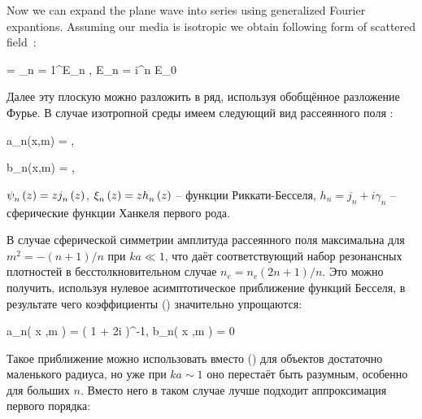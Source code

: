 Now we can expand the plane wave into series using generalized Fourier expantions. Assuming our media is isotropic we obtain following form of scattered field~\cite{boren_huffman}:

    \eq
		 = \sum_{n = 1}^{\infty}E_n , \qquad E_n = i^{n} E_0 
        \label{E_s_sph}
	\qe

    Далее эту плоскую можно разложить в ряд, используя обобщённое разложение Фурье. В случае изотропной среды имеем следующий вид рассеянного поля \cite{boren_huffman}:


    \eq
		a_n(x,\:m) = ,
		\label{an_bessel}
	\qe

    \eq
        b_n(x,\:m) = ,
        \label{bn_bessel}
    \qe
    \eqc %
    \cqe %

 ${\psi}_{n}^{} \left({z} \right) = z {j}_{n}^{} \left({z} \right)$, ${\xi}_{n}^{} \left({z} \right) = z {h}_{n}^{} \left({z} \right)$ -- функции Риккати-Бесселя, $h_n = j_n + i \gamma_n$ -- сферические функции Ханкеля первого рода.

В случае сферической симметрии амплитуда рассеянного поля максимальна для $m^2 = - (n+ 1) / n$ при $ka \ll 1$, что даёт соответствующий набор резонансных плотностей в бесстолкновительном случае $n_e = n_c(2n + 1) / n$. Это можно получить, используя нулевое асимптотическое приближение функций Бесселя, в результате чего коэффициенты () значительно упрощаются:

    \eq
        a_n\left( x ,\:m \right) = \left( 1 + 2i    \right)^{-1}, \qquad b_n\left( x ,\:m \right) = 0
        \label{ab_asymp}
    \qe

Такое приближение можно использовать вместо () для объектов достаточно маленького радиуса, но уже при $ka \sim 1$ оно перестаёт быть разумным, особенно для больших $n$. Вместо него в таком случае лучше подходит аппроксимация первого порядка:


